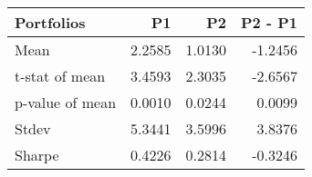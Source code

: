 \begin{tabular}{lrrr}
\toprule
Portfolios & P1 & P2 & P2 - P1 \\
\midrule
Mean & 2.2585 & 1.0130 & -1.2456 \\
t-stat of mean & 3.4593 & 2.3035 & -2.6567 \\
p-value of mean & 0.0010 & 0.0244 & 0.0099 \\
Stdev & 5.3441 & 3.5996 & 3.8376 \\
Sharpe & 0.4226 & 0.2814 & -0.3246 \\
\bottomrule
\end{tabular}
